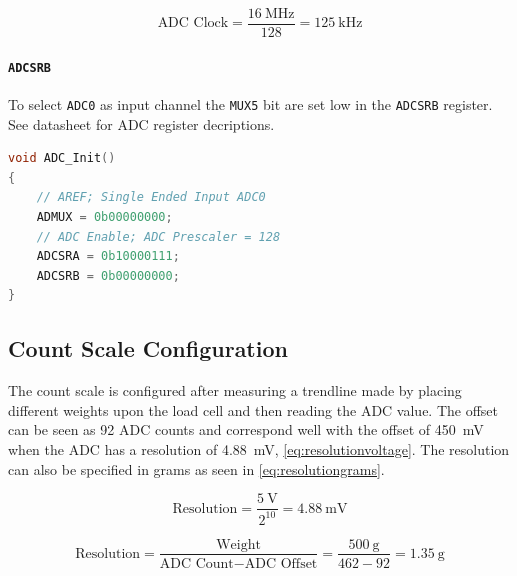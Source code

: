 \begin{equation}
\text{ADC Clock}=\frac{\SI{16}{\mega\hertz}}{128}=\SI{125}{\kilo\hertz}
\label{eq:adcclock}
\end{equation}

\paragraph{\texttt{ADCSRB}}
To select \texttt{ADC0} as input channel the \texttt{MUX5} bit are set low in the \texttt{ADCSRB} register.\\

\noindent See datasheet for ADC register decriptions. \cite[p.~281-288]{ATmega2560}

\begin{lstlisting}[caption={Initialization of ADC.}, label={lst:ADC},language=C++,directivestyle={\color{black}},
emph={int,char,double,float,unsigned},emphstyle={\color{blue}}]
void ADC_Init()
{
	// AREF; Single Ended Input ADC0
    ADMUX = 0b00000000;
    // ADC Enable; ADC Prescaler = 128
    ADCSRA = 0b10000111;
    ADCSRB = 0b00000000;
}
\end{lstlisting}


\subsection{Count Scale Configuration}
The count scale is configured after measuring a trendline made by placing different weights upon the load cell and then reading the ADC value. 
The offset can be seen as 92 ADC counts and correspond well with the offset of \SI{450}{\milli\volt} when the ADC has a resolution of \SI{4.88}{\milli\volt}, \cref{eq:resolutionvoltage}. 
The resolution can also be specified in grams as seen in \cref{eq:resolutiongrams}.

\begin{equation}
\text{Resolution}=\frac{\SI{5}{\volt}}{2^{10}}= \SI{4.88}{\milli\volt}
\label{eq:resolutionvoltage}
\end{equation}

\begin{equation}
\text{Resolution}=\frac{\text{Weight}}{\text{ADC Count}-\text{ADC Offset}}=\frac{\SI{500}{\gram}}{462-92}=\SI{1.35}{\gram}
\label{eq:resolutiongrams}
\end{equation}

